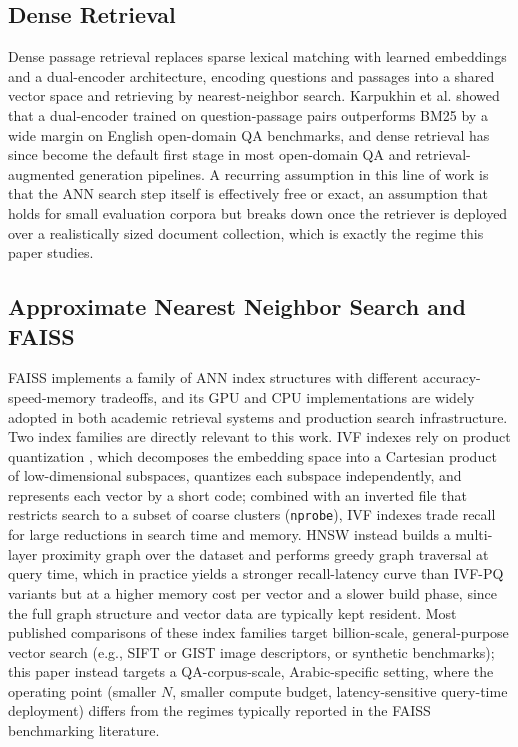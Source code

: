 \documentclass[conference]{IEEEtran}
\begin{document}
\subsection{Dense Retrieval}

Dense passage retrieval replaces sparse lexical matching with learned embeddings and a dual-encoder architecture, encoding questions and passages into a shared vector space and retrieving by nearest-neighbor search. Karpukhin et al. \cite{karpukhin2020dense} showed that a dual-encoder trained on question-passage pairs outperforms BM25 by a wide margin on English open-domain QA benchmarks, and dense retrieval has since become the default first stage in most open-domain QA and retrieval-augmented generation pipelines. A recurring assumption in this line of work is that the ANN search step itself is effectively free or exact, an assumption that holds for small evaluation corpora but breaks down once the retriever is deployed over a realistically sized document collection, which is exactly the regime this paper studies.

\subsection{Approximate Nearest Neighbor Search and FAISS}

FAISS \cite{johnson2019billion} implements a family of ANN index structures with different accuracy-speed-memory tradeoffs, and its GPU and CPU implementations are widely adopted in both academic retrieval systems and production search infrastructure. Two index families are directly relevant to this work. IVF indexes rely on product quantization \cite{jegou2011product}, which decomposes the embedding space into a Cartesian product of low-dimensional subspaces, quantizes each subspace independently, and represents each vector by a short code; combined with an inverted file that restricts search to a subset of coarse clusters (\texttt{nprobe}), IVF indexes trade recall for large reductions in search time and memory. HNSW \cite{malkov2018hnsw} instead builds a multi-layer proximity graph over the dataset and performs greedy graph traversal at query time, which in practice yields a stronger recall-latency curve than IVF-PQ variants but at a higher memory cost per vector and a slower build phase, since the full graph structure and vector data are typically kept resident. Most published comparisons of these index families target billion-scale, general-purpose vector search (e.g., SIFT or GIST image descriptors, or synthetic benchmarks); this paper instead targets a QA-corpus-scale, Arabic-specific setting, where the operating point (smaller \(N\), smaller compute budget, latency-sensitive query-time deployment) differs from the regimes typically reported in the FAISS benchmarking literature.
\end{document}
